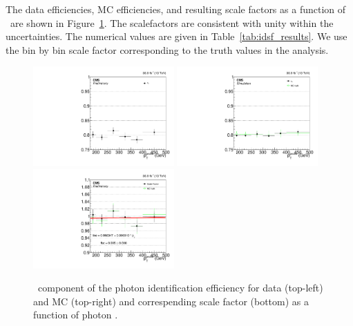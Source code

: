 The data efficiencies, MC efficiencies, and resulting scale factors as a function of \pt\ are shown in Figure~\ref{fig:idsf_results}. 
The scalefactors are consistent with unity within the uncertainties. 
The numerical values are given in Table~\ref{tab:idsf_results}. 
We use the bin by bin scale factor corresponding to the truth values in the analysis.

\begin{figure}[htbp]
  \begin{center}
    \includegraphics[width=0.48\textwidth]{Calibration/Figures/idsf/eff_data_ptalt.pdf}
    \includegraphics[width=0.48\textwidth]{Calibration/Figures/idsf/eff_mc_ptalt.pdf}
    \includegraphics[width=0.48\textwidth]{Calibration/Figures/idsf/scaleFactor_ptalt.pdf}
    \caption{
      \egamma\ component of the photon identification efficiency for data (top-left) and MC (top-right) and correspending scale factor (bottom) as a function of photon \pt.
    }
    \label{fig:idsf_results}
  \end{center}
\end{figure}
 
